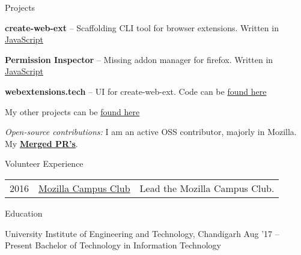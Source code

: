 \documentclass{resume} %
\begin{document}

\begin{rSection}{Projects}
  \begin{rProjectSection}
    \item \textbf {create-web-ext} -- Scaffolding CLI tool for browser extensions. Written in \href{https://github.com/web-ext-labs/create-web-ext}{JavaScript}
    \item \textbf {Permission Inspector} --   Missing addon manager for firefox. Written in \href{https://github.com/tsl143/addonManager}{JavaScript}
    \item \textbf {webextensions.tech} -- UI for create-web-ext. Code can be \href{https://github.com/web-ext-labs/ui-tool}{found here}
    \item My other projects can be \href{hhttps://soniasingla.com/#projects/}{found here}
  \end{rProjectSection}

  \begin{rBlurbSection}
    \item {\em Open-source contributions:}
      I am an active OSS contributor, majorly in Mozilla. My \href{https://github.com/issues?q=is%3Apr+author%3Asoniasingla}{\textbf{Merged PR's}}.
  \end{rBlurbSection}
\end{rSection}


\begin{rSection}{Volunteer Experience}
  \begin{tabular}{rll}
2016	     & {\href{https://github.com/moz-niec/}{Mozilla Campus Club}}  & Lead the Mozilla Campus Club.\\
\end{tabular}
\end{rSection}


\begin{rSection}{Education}
  \begin{rEducationSection}{University Institute of Engineering and Technology, Chandigarh}
                           {Aug '17 -- Present}
                           {Bachelor of Technology in Information Technology}
  \end{rEducationSection}
\end{rSection}
\end{document}
